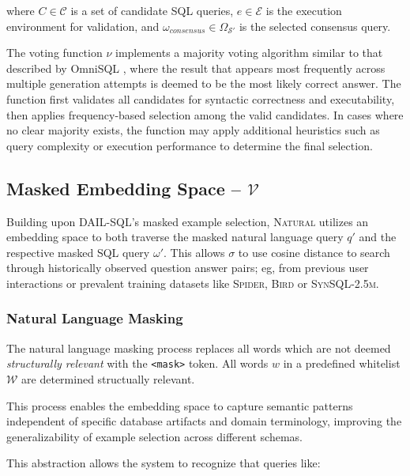 where $C \in \mathcal{C}$ is a set of candidate SQL queries, $e \in \mathcal{E}$ is
the execution environment for validation, and $\omega_{consensus} \in \Omega_{\mathcal{S}'}$
is the selected consensus query.

\vspace{0.5em}

The voting function $\nu$ implements a majority voting algorithm similar to that
described by OmniSQL \citep{OmniSQL}, where the result that appears most frequently
across multiple generation attempts is deemed to be the most likely correct answer.
The function first validates all candidates for syntactic correctness and executability,
then applies frequency-based selection among the valid candidates. In cases where
no clear majority exists, the function may apply additional heuristics such as query
complexity or execution performance to determine the final selection.

\subsection{Masked Embedding Space – $\mathcal{V}$}

Building upon DAIL-SQL's masked example selection, \textsc{Natural} utilizes an
embedding space to both traverse the masked natural language query $q'$
and the respective masked SQL query $\omega'$. This allows $\sigma$ to use
cosine distance to search through historically observed question answer pairs;
eg, from previous user interactions or prevalent training datasets like
\textsc{Spider}, \textsc{Bird} or \textsc{SynSQL-2.5m}.

\subsubsection{Natural Language Masking}

The natural language masking process replaces all words which are not deemed
\textit{structurally relevant} with the \texttt{<mask>} token. All words $w$
in a predefined whitelist $\mathcal{W}$ are determined structually relevant.


This process enables the embedding space to capture semantic patterns independent
of specific database artifacts and domain terminology, improving the generalizability
of example selection across different schemas.

This abstraction allows the system to recognize that queries like:

